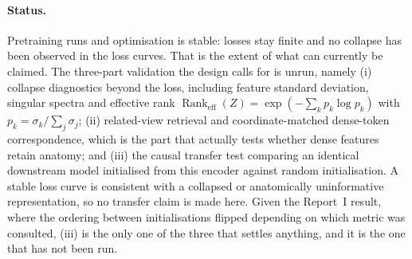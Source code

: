 \documentclass[11pt,a4paper]{article}
\newcommand{\reportone}{Report~I}
\begin{document}
\paragraph{Status.} Pretraining runs and optimisation is stable: losses stay finite and no collapse has
been observed in the loss curves. That is the extent of what can currently be claimed. The three-part
validation the design calls for is unrun, namely (i) collapse diagnostics beyond the loss, including
feature standard deviation, singular spectra and effective rank
$\operatorname{Rank}_{\text{eff}}(Z) = \exp(-\sum_k p_k \log p_k)$ with
$p_k = \sigma_k / \sum_j \sigma_j$; (ii) related-view retrieval and coordinate-matched dense-token
correspondence, which is the part that actually tests whether dense features retain anatomy; and (iii)
the causal transfer test comparing an identical downstream model initialised from this encoder against
random initialisation. A stable loss curve is consistent with a collapsed or anatomically uninformative
representation, so no transfer claim is made here. Given the \reportone{} result, where the ordering
between initialisations flipped depending on which metric was consulted, (iii) is the only one of the
three that settles anything, and it is the one that has not been run.
\end{document}
